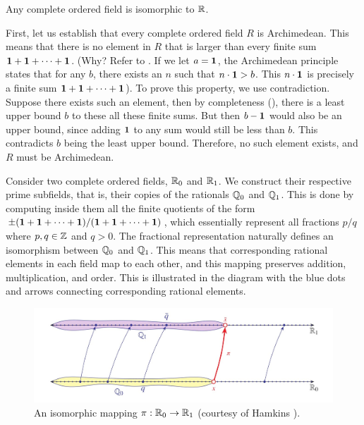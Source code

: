 \documentclass[11pt,twoside=off,numbers=noenddot]{scrbook}
\begin{document}
\begin{theorem}[Uniqueness of $\RR$]
    Any complete ordered field is isomorphic to $\RR$.
\end{theorem}

\begin{proofsketch}
    First, let us establish that every complete ordered field $R$ is Archimedean. This means that there is no element in $R$ that is larger than every finite sum $\textbf{1} + \textbf{1} + \dots + \textbf{1}$. (Why? Refer to . If we let $a = \textbf{1}$, the Archimedean principle states that for any $b$, there exists an $n$ such that $n \cdot \textbf{1} > b$. This $n \cdot \textbf{1}$ is precisely a finite sum $\textbf{1} + \textbf{1} + \dots + \textbf{1}$). To prove this property, we use contradiction. Suppose there exists such an element, then by completeness (), there is a least upper bound $b$ to these all these finite sums. But then $b - \textbf{1}$ would also be an upper bound, since adding $\textbf{1}$ to any sum would still be less than $b$. This contradicts $b$ being the least upper bound. Therefore, no such element exists, and $R$ must be Archimedean.

    Consider two complete ordered fields, $\mathbb R_0$ and $\mathbb R_1$. We construct their respective prime subfields, that is, their copies of the rationals $\mathbb Q_0$ and $\mathbb Q_1$. This is done by computing inside them all the finite quotients of the form $\pm(\textbf{1} + \textbf{1} + \dots + \textbf{1})/(\textbf{1} + \textbf{1} + \dots + \textbf{1})$, which essentially represent all fractions $p/q$ where $p, q \in \mathbb Z$ and $q > 0$. The fractional representation naturally defines an isomorphism between $\mathbb Q_0$ and $\mathbb Q_1$. This means that corresponding rational elements in each field map to each other, and this mapping preserves addition, multiplication, and order. This is illustrated in the diagram with the blue dots and arrows connecting corresponding rational elements.

    \begin{figure}[h]
        \centering
        \includegraphics[width=\textwidth]{media/uniqueness-of-the-reals.jpg}
        \caption{An isomorphic mapping $\pi : \mathbb R_0 \to \mathbb R_1$ (courtesy of Hamkins \cite{img:uniqueness-of-r}).}
    \end{figure}


\end{proofsketch}
\end{document}
